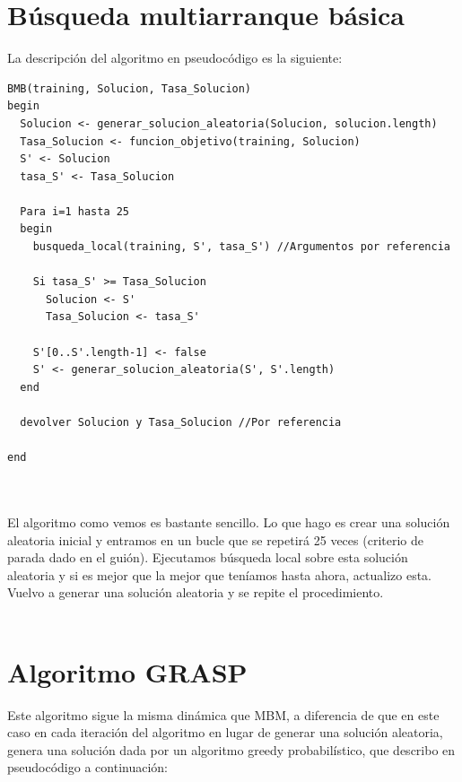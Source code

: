 \section{Búsqueda multiarranque básica}
La descripción del algoritmo en pseudocódigo es la siguiente:
\begin{lstlisting}
BMB(training, Solucion, Tasa_Solucion)
begin
  Solucion <- generar_solucion_aleatoria(Solucion, solucion.length)
  Tasa_Solucion <- funcion_objetivo(training, Solucion)
  S' <- Solucion
  tasa_S' <- Tasa_Solucion
  
  Para i=1 hasta 25
  begin
    busqueda_local(training, S', tasa_S') //Argumentos por referencia
    
    Si tasa_S' >= Tasa_Solucion
	  Solucion <- S'
	  Tasa_Solucion <- tasa_S'
	  
	S'[0..S'.length-1] <- false
	S' <- generar_solucion_aleatoria(S', S'.length)
  end
  
  devolver Solucion y Tasa_Solucion //Por referencia
  
end
\end{lstlisting}
\\
\\

El algoritmo como vemos es bastante sencillo. Lo que hago es crear una solución aleatoria inicial y entramos en un bucle que se repetirá 25 veces (criterio de parada dado en el guión). Ejecutamos búsqueda local sobre esta solución aleatoria y si es mejor que la mejor que teníamos hasta ahora, actualizo esta. Vuelvo a generar una solución aleatoria y se repite el procedimiento.
\\
\\

\section{Algoritmo GRASP}
Este algoritmo sigue la misma dinámica que MBM, a diferencia de que en este caso en cada iteración del algoritmo en lugar de generar una solución aleatoria, genera una solución dada por un algoritmo greedy probabilístico, que describo en pseudocódigo a continuación:

